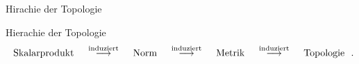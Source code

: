 \documentclass[class=article, crop=false]{standalone}
\begin{document}
\begin{zettel}{Hirachie der Topologie}
\begin{flashcard}[rqzboa1v]{Hierachie der Topologie}
	\[
		\tx{ Skalarprodukt } \stackrel{ \tx{ induziert } }{\longrightarrow} \tx{ Norm } \stackrel{\tx{ induziert } }{\longrightarrow} \tx{ Metrik }  \stackrel{\tx{ induziert } }{\longrightarrow} \tx{ Topologie }\\
	.\]
\end{flashcard}

\end{zettel}
\end{document}

